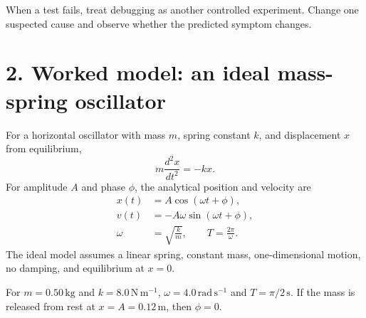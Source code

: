 \documentclass[11pt,a4paper]{article}
\begin{document}
\begin{center}
\end{center}

When a test fails, treat debugging as another controlled experiment. Change one suspected cause and observe whether the predicted symptom changes.

\section*{2. Worked model: an ideal mass-spring oscillator}
For a horizontal oscillator with mass $m$, spring constant $k$, and displacement $x$ from equilibrium,
\begin{equation}
  m\frac{d^2x}{dt^2}=-kx.
\end{equation}
For amplitude $A$ and phase $\phi$, the analytical position and velocity are
\begin{align}
  x(t)&=A\cos(\omega t+\phi),\\
  v(t)&=-A\omega\sin(\omega t+\phi),\\
  \omega&=\sqrt{\frac{k}{m}}, \qquad T=\frac{2\pi}{\omega}.
\end{align}
The ideal model assumes a linear spring, constant mass, one-dimensional motion, no damping, and equilibrium at $x=0$.

For $m=0.50\,\mathrm{kg}$ and $k=8.0\,\mathrm{N\,m^{-1}}$, $\omega=4.0\,\mathrm{rad\,s^{-1}}$ and $T=\pi/2\,\mathrm{s}$. If the mass is released from rest at $x=A=0.12\,\mathrm{m}$, then $\phi=0$.
\end{document}
